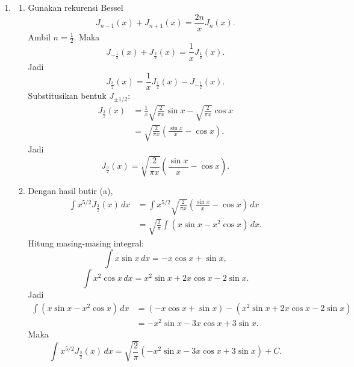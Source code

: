 \documentclass[11pt,letterpaper]{article}
\begin{document}
\begin{enumerate}[leftmargin=*, itemsep=0.45cm]
  \item \begin{enumerate}[label=\alph*)]
          \item Gunakan rekurensi Bessel
                \[
                  J_{n-1}(x)+J_{n+1}(x)=\frac{2n}{x}J_n(x).
                \]
                Ambil $n=\frac{1}{2}$. Maka
                \[
                  J_{-\frac{1}{2}}(x)+J_{\frac{3}{2}}(x)=\frac{1}{x}J_{\frac{1}{2}}(x).
                \]
                Jadi
                \[
                  J_{\frac{3}{2}}(x)=\frac{1}{x}J_{\frac{1}{2}}(x)-J_{-\frac{1}{2}}(x).
                \]
                Substitusikan bentuk $J_{\pm 1/2}$:
                \begin{align*}
                  J_{\frac{3}{2}}(x)
                   & =\frac{1}{x}\sqrt{\frac{2}{\pi x}}\sin x-\sqrt{\frac{2}{\pi x}}\cos x \\
                   & =\sqrt{\frac{2}{\pi x}}\left(\frac{\sin x}{x}-\cos x\right).
                \end{align*}
                Jadi
                \[
                  \boxed{J_{\frac{3}{2}}(x)=\sqrt{\frac{2}{\pi x}}\left(\frac{\sin x}{x}-\cos x\right).}
                \]

          \item Dengan hasil butir (a),
                \begin{align*}
                  \int x^{5/2}J_{\frac{3}{2}}(x)\,dx
                   & =\int x^{5/2}\sqrt{\frac{2}{\pi x}}\left(\frac{\sin x}{x}-\cos x\right)\,dx \\
                   & =\sqrt{\frac{2}{\pi}}\int \left(x\sin x-x^2\cos x\right)\,dx.
                \end{align*}
                Hitung masing-masing integral:
                \[
                  \int x\sin x\,dx=-x\cos x+\sin x,
                \]
                \[
                  \int x^2\cos x\,dx=x^2\sin x+2x\cos x-2\sin x.
                \]
                Jadi
                \begin{align*}
                  \int \left(x\sin x-x^2\cos x\right)\,dx
                   & =(-x\cos x+\sin x)-(x^2\sin x+2x\cos x-2\sin x) \\
                   & =-x^2\sin x-3x\cos x+3\sin x.
                \end{align*}
                Maka
                \[
                  \boxed{
                    \int x^{5/2}J_{\frac{3}{2}}(x)\,dx
                    =
                    \sqrt{\frac{2}{\pi}}
                    \left(
                    -x^2\sin x-3x\cos x+3\sin x
                    \right)+C.
                  }
                \]
        \end{enumerate}
\end{enumerate}
\end{document}
